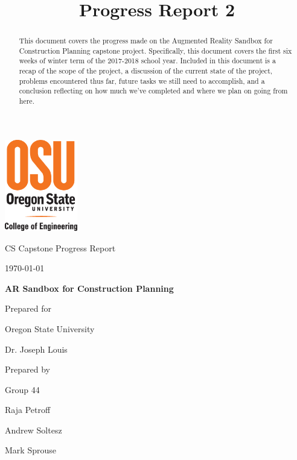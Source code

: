 \documentclass[onecolumn, draftclsnofoot,10pt, compsoc]{IEEEtran}
\title{Progress Report 2}
\def \CapstoneTeamName{		Team Sandy}
\def \CapstoneTeamNumber{		44}
\def \GroupMemberOne{			Raja Petroff			}
\def \GroupMemberTwo{			Andrew Soltesz			}
\def \GroupMemberThree{			Mark Sprouse}
\def \CapstoneProjectName{		AR Sandbox for Construction Planning}
\def \CapstoneSponsorCompany{	Oregon State University}
\def \CapstoneSponsorPerson{		Dr. Joseph Louis}
\def \DocType{		%
				Progress Report
				}
\newcommand{\NameSigPair}[1]{\par
\makebox[2.75in][r]{#1} \hfil 	\makebox[3.25in]{\makebox[2.25in]{\hrulefill} \hfill		\makebox[.75in]{\hrulefill}}
\par\vspace{-12pt} \textit{\tiny\noindent
\makebox[2.75in]{} \hfil		\makebox[3.25in]{\makebox[2.25in][r]{Signature} \hfill	\makebox[.75in][r]{Date}}}}
\renewcommand{\NameSigPair}[1]{#1}
\begin{document}
\begin{titlepage}
    \begin{singlespace}
    	\includegraphics[height=4cm]{coe_v_spot1}
        \hfill 
        \par\vspace{.2in}
        \centering
        \scshape{
            \huge CS Capstone \DocType \par
            {\large\today}\par
            \vspace{.5in}
            \textbf{\Huge\CapstoneProjectName}\par
            \vfill
            {\large Prepared for}\par
            \Huge \CapstoneSponsorCompany\par
            \vspace{5pt}
            {\Large\NameSigPair{\CapstoneSponsorPerson}\par}
            {\large Prepared by }\par
            Group\CapstoneTeamNumber\par
            \vspace{5pt}
            {\Large
                \NameSigPair{\GroupMemberOne}\par
                \NameSigPair{\GroupMemberTwo}\par
                \NameSigPair{\GroupMemberThree}\par
            }
            \vspace{20pt}
        }
        \begin{abstract}
                This document covers the progress made on the Augmented Reality Sandbox for Construction Planning capstone project.
                Specifically, this document covers the first six weeks of winter term of the 2017-2018 school year.
                Included in this document is a recap of the scope of the project, a discussion of the current state of the project, problems encountered thus far, future tasks we still need to accomplish, and a conclusion reflecting on how much we've completed and where we plan on going from here.
        \end{abstract}     
    \end{singlespace}
\end{titlepage}
\newpage
{}
\tableofcontents
\clearpage
\end{document}
